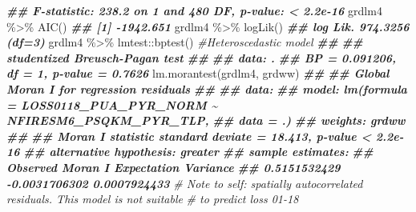 \documentclass[10pt,landscape,a3paper]{article}
\newenvironment{Shaded}{\begin{snugshade}}{\end{snugshade}}
\newcommand{\CommentTok}[1]{\textcolor[rgb]{0.56,0.35,0.01}{\textit{#1}}}
\newcommand{\DocumentationTok}[1]{\textcolor[rgb]{0.56,0.35,0.01}{\textbf{\textit{#1}}}}
\newcommand{\FunctionTok}[1]{\textcolor[rgb]{0.00,0.00,0.00}{#1}}
\newcommand{\NormalTok}[1]{#1}
\newcommand{\SpecialCharTok}[1]{\textcolor[rgb]{0.00,0.00,0.00}{#1}}
\begin{document}
\begin{Shaded}
\begin{Highlighting}[]
\DocumentationTok{\#\# F{-}statistic: 238.2 on 1 and 480 DF,  p{-}value: \textless{} 2.2e{-}16}
\NormalTok{grdlm4 }\SpecialCharTok{\%\textgreater{}\%}
    \FunctionTok{AIC}\NormalTok{()}
\DocumentationTok{\#\# [1] {-}1942.651}
\NormalTok{grdlm4 }\SpecialCharTok{\%\textgreater{}\%}
    \FunctionTok{logLik}\NormalTok{()}
\DocumentationTok{\#\# \textquotesingle{}log Lik.\textquotesingle{} 974.3256 (df=3)}
\NormalTok{grdlm4 }\SpecialCharTok{\%\textgreater{}\%}
\NormalTok{    lmtest}\SpecialCharTok{::}\FunctionTok{bptest}\NormalTok{()  }\CommentTok{\#Heteroscedastic model }
\DocumentationTok{\#\# }
\DocumentationTok{\#\#  studentized Breusch{-}Pagan test}
\DocumentationTok{\#\# }
\DocumentationTok{\#\# data:  .}
\DocumentationTok{\#\# BP = 0.091206, df = 1, p{-}value = 0.7626}
\FunctionTok{lm.morantest}\NormalTok{(grdlm4, grdww)}
\DocumentationTok{\#\# }
\DocumentationTok{\#\#  Global Moran I for regression residuals}
\DocumentationTok{\#\# }
\DocumentationTok{\#\# data:  }
\DocumentationTok{\#\# model: lm(formula = LOSS0118\_PUA\_PYR\_NORM \textasciitilde{} NFIRESM6\_PSQKM\_PYR\_TLP,}
\DocumentationTok{\#\# data = .)}
\DocumentationTok{\#\# weights: grdww}
\DocumentationTok{\#\# }
\DocumentationTok{\#\# Moran I statistic standard deviate = 18.413, p{-}value \textless{} 2.2e{-}16}
\DocumentationTok{\#\# alternative hypothesis: greater}
\DocumentationTok{\#\# sample estimates:}
\DocumentationTok{\#\# Observed Moran I      Expectation         Variance }
\DocumentationTok{\#\#     0.5151532429    {-}0.0031706302     0.0007924433}
\CommentTok{\# Note to self: spatially autocorrelated residuals. This model is not suitable}
\CommentTok{\# to predict loss 01{-}18}


\end{Highlighting}
\end{Shaded}
\end{document}
